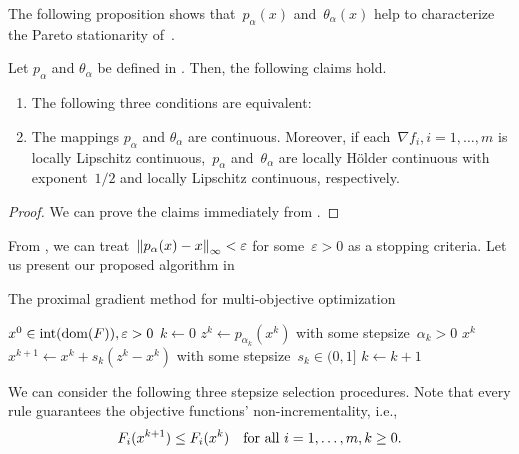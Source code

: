 \documentclass[../main]{subfiles}
\begin{document}
The following proposition shows that~$p_\alpha(x)$ and~$\theta_\alpha(x)$ help to characterize the Pareto stationarity of~.
\begin{lemma} 
    Let $p_\alpha$ and $\theta_\alpha$ be defined in .
    Then, the following claims hold.
	\begin{enumerate}
        \item The following three conditions are equivalent:
             
		\item The mappings $p_\alpha$ and $\theta_\alpha$ are continuous.
            Moreover, if each~$\nabla f_i, i = 1, \dots, m$ is locally Lipschitz continuous,~$p_\alpha$ and~$\theta_\alpha$ are locally H\"older continuous with exponent~$1 / 2$ and locally Lipschitz continuous, respectively. 
	\end{enumerate}
\end{lemma}
\begin{proof}
    We can prove the claims immediately from .
\end{proof}

From , we can treat~$\norm*{p_\alpha(x) - x}_\infty < \varepsilon$ for some~$\varepsilon > 0$ as a stopping criteria.
Let us present our proposed algorithm in 
\begin{algorithm}[hbtp]
    \caption{The proximal gradient method for multi-objective optimization}
    \begin{algorithmic}[1]
        \Require $x^0 \in \interior (\dom (F)), \varepsilon > 0$
        \State $k \gets 0$
        \Loop
        \State $z^k \gets p_{\alpha_k}(x^k)$ with some stepsize~$\alpha_k > 0$ 
        \State \Return $x^k$
        \EndIf
        \State $x^{k + 1} \gets x^k + s_k (z^k - x^k)$ with some stepsize~$s_k \in (0, 1]$ 
        \State $k \gets k + 1$
        \EndLoop
    \end{algorithmic}
\end{algorithm}
We can consider the following three stepsize selection procedures.
Note that every rule guarantees the objective functions' non-incrementality, i.e.,
\begin{equation} \label{eq:pgm_nonincrementality}
    F_i(x^{k + 1}) \le F_i(x^k) \forallcondition{i = 1, \dots, m, k \geq 0}
.\end{equation}
\end{document}
